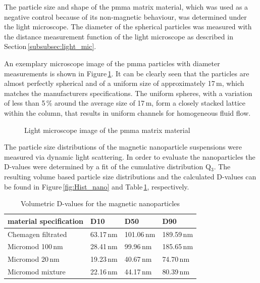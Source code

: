 The particle size and shape of the \gls{pmma} matrix material, which was used as a negative control because of its non-magnetic behaviour, was determined under the light microscope. The diameter of the spherical particles was measured with the distance measurement function of the light microscope as described in Section\,\ref{subsubsec:light_mic}.

An exemplary microscope image of the \gls{pmma} particles with diameter measurements is shown in Figure\,\ref{fig:PMMA}. It can be clearly seen that the particles are almost perfectly spherical and of a uniform size of approximately 17\,\textmu m, which matches the manufacturers specifications. The uniform spheres, with a variation of less than 5\,\% around the average size of 17\,\textmu m, form a closely stacked lattice within the column, that results in uniform channels for homogeneous fluid flow.

\begin{figure}[H]
\centering

\caption[Light microscope image of PMMA matrix material]{Light microscope image of the \gls{pmma} matrix material
\label{fig:PMMA}
}
\end{figure}

The particle size distributions of the magnetic nanoparticle suspensions were measured via dynamic light scattering. In order to evaluate the nanoparticles the D-values were determined by a fit of the cumulative distribution Q$_{3}$. The resulting volume based particle size distributions and the calculated D-values can be found in Figure\,\ref{fig:Hist_nano} and Table\,\ref{table:D_values}, respectively.

\begin{table}[h]
\centering
\caption[Volumetric D-values for the magnetic nanoparticles]{Volumetric D-values for the magnetic nanoparticles}
\label{table:D_values}
\begin{tabularx}{\textwidth}{XXXX}\hline
material specification & D10  & D50 & D90  \\
\hline\hline
Chemagen filtrated & 63.17\,nm & 101.06\,nm & 189.59\,nm \\
Micromod 100\,nm & 28.41\,nm & 99.96\,nm & 185.65\,nm \\
Micromod 20\,nm & 19.23\,nm & 40.67\,nm & 74.70\,nm \\
Micromod mixture & 22.16\,nm & 44.17\,nm & 80.39\,nm \\
\hline
\end{tabularx}
\end{table}  

